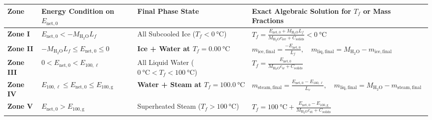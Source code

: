 \begin{center}
\label{tab:04:fivezones}
\footnotesize\setlength{\tabcolsep}{4pt}\renewcommand{\arraystretch}{1.22}
\begin{tabularx}{\linewidth}{@{}l l l X@{}}\toprule
\textbf{Zone} & \textbf{Energy Condition on $E_{\mathrm{net},0}$} & \textbf{Final Phase State} & \textbf{Exact Algebraic Solution for $T_f$ or Mass Fractions} \\\midrule
\textbf{Zone I} & $E_{\mathrm{net},0} < -M_{\mathrm{H_2O}} L_f$ & All Subcooled Ice ($T_f < \SI{0}{\celsius}$) & $\displaystyle T_f = \frac{E_{\mathrm{net},0} + M_{\mathrm{H_2O}} L_f}{M_{\mathrm{H_2O}} c_{\mathrm{ice}} + C_{\mathrm{solids}}} < \SI{0}{\celsius}$ \\
\textbf{Zone II} & $-M_{\mathrm{H_2O}} L_f \leq E_{\mathrm{net},0} \leq 0$ & \textbf{Ice + Water at $T_f = \SI{0.00}{\celsius}$} & $\displaystyle m_{\mathrm{ice,final}} = \frac{-E_{\mathrm{net},0}}{L_f}, \quad m_{\mathrm{liq,final}} = M_{\mathrm{H_2O}} - m_{\mathrm{ice,final}}$ \\
\textbf{Zone III} & $0 < E_{\mathrm{net},0} < E_{\mathrm{100,\ell}}$ & All Liquid Water ($\SI{0}{\celsius} < T_f < \SI{100}{\celsius}$) & $\displaystyle T_f = \frac{E_{\mathrm{net},0}}{M_{\mathrm{H_2O}} c_w + C_{\mathrm{solids}}}$ \\
\textbf{Zone IV} & $E_{\mathrm{100,\ell}} \leq E_{\mathrm{net},0} \leq E_{\mathrm{100,g}}$ & \textbf{Water + Steam at $T_f = \SI{100.0}{\celsius}$} & $\displaystyle m_{\mathrm{steam,final}} = \frac{E_{\mathrm{net},0} - E_{\mathrm{100,\ell}}}{L_v}, \quad m_{\mathrm{liq,final}} = M_{\mathrm{H_2O}} - m_{\mathrm{steam,final}}$ \\
\textbf{Zone V} & $E_{\mathrm{net},0} > E_{\mathrm{100,g}}$ & Superheated Steam ($T_f > \SI{100}{\celsius}$) & $\displaystyle T_f = \SI{100}{\celsius} + \frac{E_{\mathrm{net},0} - E_{\mathrm{100,g}}}{M_{\mathrm{H_2O}} c_{\mathrm{st}} + C_{\mathrm{solids}}}$ \\\bottomrule
\end{tabularx}
\end{center}

